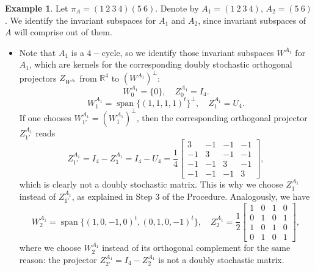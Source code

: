 \documentclass{article}
\theoremstyle{definition}\newtheorem{example}{Example}[section]
\def\RR{\mathbb{R}}
\begin{document}
	
	
	\begin{example}
	Let $\pi_A=(1\ 2\ 3\ 4)(5\ 6)$. Denote by  $A_1=(1\ 2\ 3\ 4)$, $A_2=(5\ 6)$. We identify the invariant subspaces for $A_1$ and $A_2$, since invariant subspaces of $A$ will comprise out of them. 
	\begin{itemize}
	\item Note that $A_1$ is a $4-$cycle, so we identify those invariant subspaces $W^{A_1}$ for $A_1$, which are kernels for the corresponding doubly stochastic orthogonal projectors $Z_{W^{A_1}}$ from $\RR^4$ to $\left(W^{A_1}\right)^\perp$:
	$$W^{A_1}_0=\{0\},\quad Z^{A_1}_0=I_4.$$
	$$W^{A_1}_1=\operatorname{span}\{(1,1,1,1)^t\}^\perp,\quad Z^{A_1}_1=U_4.$$
	If one chooses $W^{A_1}_{1'}=\left(W^{A_1}_{1}\right)^\perp$, then the corresponding orthogonal projector $Z^{A_1}_{1'}$ reads $$Z^{A_1}_{1'}=I_4-Z^{A_1}_1=I_4-U_4=\frac{1}{4}\left[\begin{array}{rrrr}3 & -1 & -1 & -1 \\
		-1 & 3 & -1 & -1\\-1 & -1 & 3 & -1 \\-1 & -1 & -1 & 3\end{array}\right],$$
		which is clearly not a doubly stochastic matrix. This is why we choose $Z^{A_1}_1$ instead of $Z^{A_1}_{1'}$, as explained in Step $3$ of the Procedure. Analogously, we have  $$W^{A_1}_2=\operatorname{span}\{(1, 0, -1, 0)^t, (0, 1, 0, -1)^t\},\quad Z^{A_1}_{2}=\frac{1}{2}\left[\begin{array}{cccc}1 & 0 & 1 & 0 \\
	 	0 & 1 & 0 & 1\\1 & 0 & 1 & 0 \\0 & 1 & 0 & 1\end{array}\right],$$
	 	where we choose $W^{A_1}_2$ instead of its orthogonal complement for the same reason: the projector $Z^{A_1}_{2'}=I_4-Z^{A_1}_2$ is not a doubly stochastic matrix.
	 	

\end{itemize}
\end{example}
\end{document}
